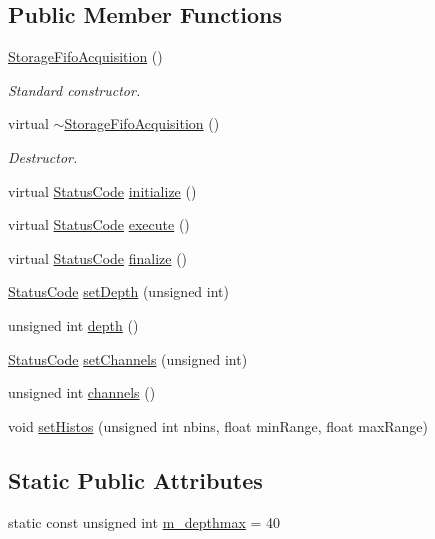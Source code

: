 \subsection*{Public Member Functions}
\begin{DoxyCompactItemize}
\item 
\hyperlink{classStorageFifoAcquisition_a32975d5adfb2fbeeaf18b50be5fb58fe}{Storage\+Fifo\+Acquisition} ()
\begin{DoxyCompactList}\small\item\em Standard constructor. \end{DoxyCompactList}\item 
virtual \hyperlink{classStorageFifoAcquisition_acfa89ab91baa3dbd3a8651992c396cf3}{$\sim$\+Storage\+Fifo\+Acquisition} ()
\begin{DoxyCompactList}\small\item\em Destructor. \end{DoxyCompactList}\item 
virtual \hyperlink{classStatusCode}{Status\+Code} \hyperlink{classStorageFifoAcquisition_a9cf77a05d754282e7737fb439bfa835d}{initialize} ()
\item 
virtual \hyperlink{classStatusCode}{Status\+Code} \hyperlink{classStorageFifoAcquisition_a36ffcd2b9bd7ff721c4d0b638b8e4901}{execute} ()
\item 
virtual \hyperlink{classStatusCode}{Status\+Code} \hyperlink{classStorageFifoAcquisition_acb6eee350941bc44e2a4cb768b359d4f}{finalize} ()
\item 
\hyperlink{classStatusCode}{Status\+Code} \hyperlink{classStorageFifoAcquisition_a34f9ade5de4933552aa7bcfdf6a9c264}{set\+Depth} (unsigned int)
\item 
unsigned int \hyperlink{classStorageFifoAcquisition_a2d549502ced65dc2e02500d2216ad23b}{depth} ()
\item 
\hyperlink{classStatusCode}{Status\+Code} \hyperlink{classStorageFifoAcquisition_adc27c0b9e7c3e8b35679bf461258769d}{set\+Channels} (unsigned int)
\item 
unsigned int \hyperlink{classStorageFifoAcquisition_ab8ff708c3269e56312115df8351bbe24}{channels} ()
\item 
void \hyperlink{classStorageFifoAcquisition_af1482fb0a9e3cd5210902cf96b3f5313}{set\+Histos} (unsigned int nbins, float min\+Range, float max\+Range)
\end{DoxyCompactItemize}
\subsection*{Static Public Attributes}
\begin{DoxyCompactItemize}
\item 
static const unsigned int \hyperlink{classStorageFifoAcquisition_a2f3ce0569ee9ec4fa78ec66a9cbe6ed7}{m\+\_\+depthmax} = 40
\end{DoxyCompactItemize}
